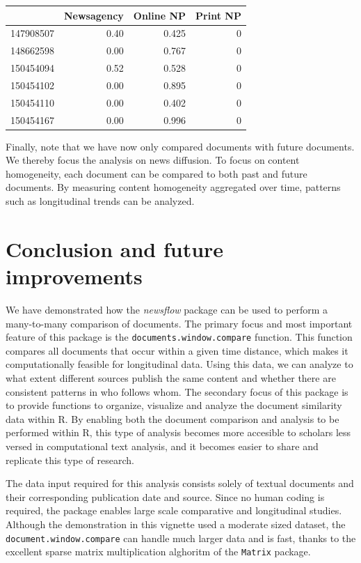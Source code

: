 \documentclass[]{article}
\begin{document}
\begin{longtable}[c]{@{}lrrr@{}}
\toprule
& Newsagency & Online NP & Print NP\tabularnewline
\midrule
\endhead
147908507 & 0.40 & 0.425 & 0\tabularnewline
148662598 & 0.00 & 0.767 & 0\tabularnewline
150454094 & 0.52 & 0.528 & 0\tabularnewline
150454102 & 0.00 & 0.895 & 0\tabularnewline
150454110 & 0.00 & 0.402 & 0\tabularnewline
150454167 & 0.00 & 0.996 & 0\tabularnewline
\bottomrule
\end{longtable}

Finally, note that we have now only compared documents with future
documents. We thereby focus the analysis on news diffusion. To focus on
content homogeneity, each document can be compared to both past and
future documents. By measuring content homogeneity aggregated over time,
patterns such as longitudinal trends can be analyzed.

\section{Conclusion and future
improvements}\label{conclusion-and-future-improvements}

We have demonstrated how the \emph{newsflow} package can be used to
perform a many-to-many comparison of documents. The primary focus and
most important feature of this package is the
\texttt{documents.window.compare} function. This function compares all
documents that occur within a given time distance, which makes it
computationally feasible for longitudinal data. Using this data, we can
analyze to what extent different sources publish the same content and
whether there are consistent patterns in who follows whom. The secondary
focus of this package is to provide functions to organize, visualize and
analyze the document similarity data within R. By enabling both the
document comparison and analysis to be performed within R, this type of
analysis becomes more accesible to scholars less versed in computational
text analysis, and it becomes easier to share and replicate this type of
research.

The data input required for this analysis consists solely of textual
documents and their corresponding publication date and source. Since no
human coding is required, the package enables large scale comparative
and longitudinal studies. Although the demonstration in this vignette
used a moderate sized dataset, the \texttt{document.window.compare} can
handle much larger data and is fast, thanks to the excellent sparse
matrix multiplication alghoritm of the \texttt{Matrix} package.
\end{document}
